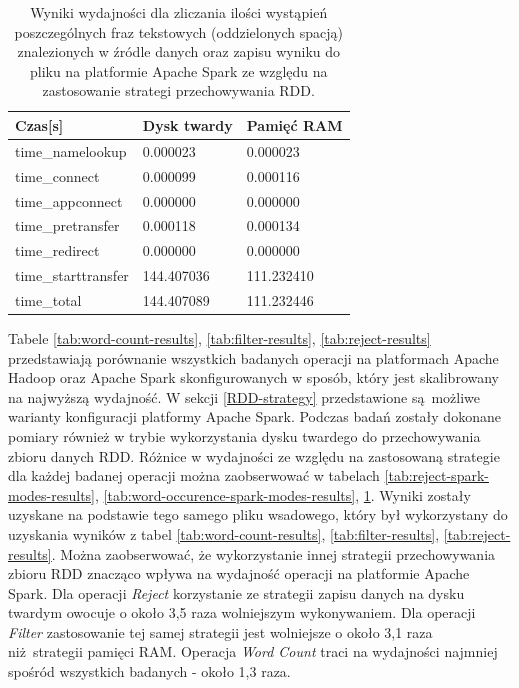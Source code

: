 \begin{table}[]
	\centering
	\caption{Wyniki wydajności dla zliczania ilości wystąpień poszczególnych fraz tekstowych (oddzielonych spacją) znalezionych w źródle danych oraz zapisu wyniku do pliku na platformie Apache Spark ze względu na zastosowanie strategi przechowywania RDD.}
	\label{tab:word-count-spark-modes-results}
	\begin{tabular}{|l|l|l|}
		\hline
		Czas{[}s{]}         & Dysk twardy & Pamięć RAM \\ \hline
		time\_namelookup    & 0.000023    & 0.000023   \\ \hline
		time\_connect       & 0.000099    & 0.000116   \\ \hline
		time\_appconnect    & 0.000000    & 0.000000   \\ \hline
		time\_pretransfer   & 0.000118    & 0.000134   \\ \hline
		time\_redirect      & 0.000000    & 0.000000   \\ \hline
		time\_starttransfer & 144.407036  & 111.232410 \\ \hline
		time\_total         & 144.407089  & 111.232446 \\ \hline
	\end{tabular}
\end{table}
Tabele \ref{tab:word-count-results}, \ref{tab:filter-results}, \ref{tab:reject-results} przedstawiają porównanie wszystkich badanych operacji na platformach Apache Hadoop oraz Apache Spark skonfigurowanych w sposób, który jest skalibrowany na najwyższą wydajność. W sekcji \ref{RDD-strategy} przedstawione są możliwe warianty konfiguracji platformy Apache Spark. Podczas badań zostały dokonane pomiary również w trybie wykorzystania dysku twardego do przechowywania zbioru danych RDD. Różnice w wydajności ze względu na zastosowaną strategie dla każdej badanej operacji można zaobserwować w tabelach \ref{tab:reject-spark-modes-results}, \ref{tab:word-occurence-spark-modes-results}, \ref{tab:word-count-spark-modes-results}. Wyniki zostały uzyskane na podstawie tego samego pliku wsadowego, który był wykorzystany do uzyskania wyników z tabel  \ref{tab:word-count-results}, \ref{tab:filter-results}, \ref{tab:reject-results}. Można zaobserwować, że wykorzystanie innej strategii przechowywania zbioru RDD znacząco wpływa na wydajność operacji na platformie Apache Spark. Dla operacji \textit{Reject} korzystanie ze strategii zapisu danych na dysku twardym owocuje o około 3,5 raza wolniejszym wykonywaniem. Dla operacji \textit{Filter}  zastosowanie tej samej strategii jest wolniejsze o około 3,1 raza niż strategii pamięci RAM. Operacja \textit{Word Count} traci na wydajności najmniej spośród wszystkich badanych - około 1,3 raza.  
